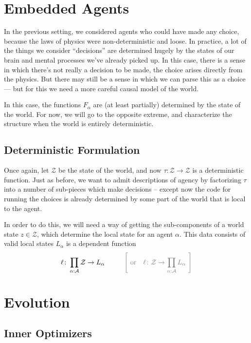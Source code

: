 \documentclass{article}
\theoremstyle{definition}
\newcommand{\Z}{\mathcal Z}
\begin{document}
	

	\section{Embedded Agents} %
	
	In the previous setting, we considered agents who could have made any choice, because the laws of physics were non-deterministic and loose. In practice, a lot of the things we consider ``decisions'' are determined hugely by the states of our brain and mental processes we've already picked up. In this case, there is a sense in which there's not really a decision to be made, the choice arises directly from the physics. But there may still be a sense in which we can parse this as a choice --- but for this we need a more careful causal model of the world.
	
	In this case, the functions $F_\alpha$ are (at least partially) determined by the state of the world. For now, we will go to the opposite extreme, and characterize the structure when the world is entirely deterministic. 
	
	\subsection{Deterministic Formulation}
	Once again, let $\Z$ be the state of the world, and now $\tau\colon \Z \to \Z$ is a deterministic function. Just as before, we want to admit descriptions of agency by factorizing $\tau$ into a number of sub-pieces which make decisions -- except now the code for running the choices is already determined by some part of the world that is local to the agent.
	
	In order to do this, we will need a way of getting the sub-components of a world state $z \in \Z$, which determine the local state for an agent $\alpha$. This data consists of valid local states $L_\alpha$ is a dependent function
	\[ \ell \colon \prod_{\alpha: \cal A}\Z \to L_\alpha \hspace{1cm} {\color{gray}\Bigg[~\text{or}\quad \ell \colon \Z \to \prod_{\alpha: \cal A} L_\alpha~\Bigg] } \]
	
	
	
	\section{Evolution} %
	
	\subsection{Inner Optimizers}
\end{document}
